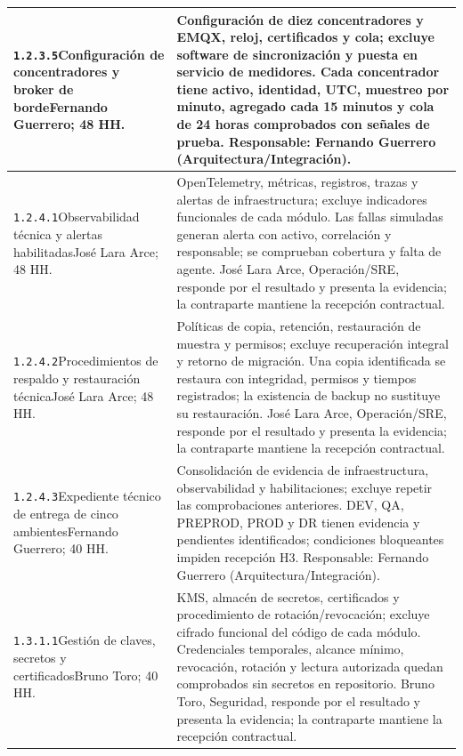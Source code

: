\begin{longtable}{L{52mm}L{91mm}}
\texttt{1.\allowbreak{}2.\allowbreak{}3.\allowbreak{}5}\newline Configuración de concentradores y broker de borde\newline Fernando Guerrero; 48 HH. & Configuración de diez concentradores y EMQX, reloj, certificados y cola; excluye software de sincronización y puesta en servicio de medidores. Cada concentrador tiene activo, identidad, UTC, muestreo por minuto, agregado cada 15 minutos y cola de 24 horas comprobados con señales de prueba. Responsable: Fernando Guerrero (Arquitectura/Integración).\\\hline
\texttt{1.\allowbreak{}2.\allowbreak{}4.\allowbreak{}1}\newline Observabilidad técnica y alertas habilitadas\newline José Lara Arce; 48 HH. & OpenTelemetry, métricas, registros, trazas y alertas de infraestructura; excluye indicadores funcionales de cada módulo. Las fallas simuladas generan alerta con activo, correlación y responsable; se comprueban cobertura y falta de agente. José Lara Arce, Operación/SRE, responde por el resultado y presenta la evidencia; la contraparte mantiene la recepción contractual.\\\hline
\texttt{1.\allowbreak{}2.\allowbreak{}4.\allowbreak{}2}\newline Procedimientos de respaldo y restauración técnica\newline José Lara Arce; 48 HH. & Políticas de copia, retención, restauración de muestra y permisos; excluye recuperación integral y retorno de migración. Una copia identificada se restaura con integridad, permisos y tiempos registrados; la existencia de backup no sustituye su restauración. José Lara Arce, Operación/SRE, responde por el resultado y presenta la evidencia; la contraparte mantiene la recepción contractual.\\\hline
\texttt{1.\allowbreak{}2.\allowbreak{}4.\allowbreak{}3}\newline Expediente técnico de entrega de cinco ambientes\newline Fernando Guerrero; 40 HH. & Consolidación de evidencia de infraestructura, observabilidad y habilitaciones; excluye repetir las comprobaciones anteriores. DEV, QA, PREPROD, PROD y DR tienen evidencia y pendientes identificados; condiciones bloqueantes impiden recepción H3. Responsable: Fernando Guerrero (Arquitectura/Integración).\\\hline
\texttt{1.\allowbreak{}3.\allowbreak{}1.\allowbreak{}1}\newline Gestión de claves, secretos y certificados\newline Bruno Toro; 40 HH. & KMS, almacén de secretos, certificados y procedimiento de rotación/revocación; excluye cifrado funcional del código de cada módulo. Credenciales temporales, alcance mínimo, revocación, rotación y lectura autorizada quedan comprobados sin secretos en repositorio. Bruno Toro, Seguridad, responde por el resultado y presenta la evidencia; la contraparte mantiene la recepción contractual.\\\hline

\end{longtable}
